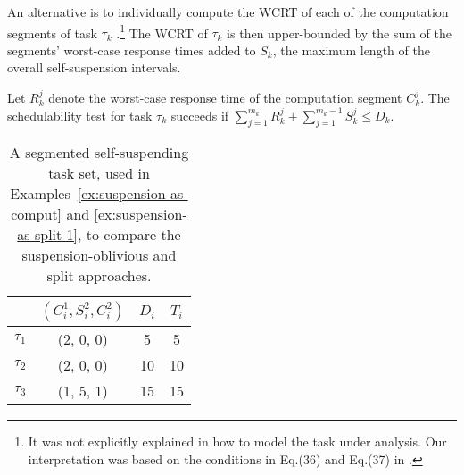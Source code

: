 

\label{sec:model-interferred:split}

An alternative is to individually compute the WCRT of each of the computation segments of task $\tau_k$ \cite{bletsas:thesis,PH:rtss98,Huang:multiseg}.\footnote{\label{footnote-rtss98}It was not explicitly explained in \cite{PH:rtss98} how to model the task under analysis. Our interpretation was based on the conditions in Eq.(36) and Eq.(37) in \cite{PH:rtss98}.}
The WCRT of $\tau_k$ is then upper-bounded by the sum of the segments' worst-case response times added to $S_k$, the maximum length of the overall
self-suspension intervals. 
 
Let $R_k^j$ denote the worst-case response time of the computation segment $C_k^j$. The schedulability test for task $\tau_k$ succeeds if $\sum_{j=1}^{m_k} R_k^j + \sum_{j=1}^{m_k-1} S_k^j \leq D_k $. 

\begin{table}[t]
\centering
    \begin{tabular}{|c|c|c|c|}
 \hline
        & $(C_i^1, S_i^2, C_i^2)$ &  $D_i$ & $T_i$\\ 
        \hline
        $\tau_1$ & (2, 0, 0) &  5 & 5\\ 
        $\tau_2$ &  (2, 0, 0) & 10 & 10 \\ 
        $\tau_3$ & (1, 5, 1) & 15  & 15\\
        \hline
    \end{tabular} 
    \caption{A segmented self-suspending task set, used in Examples~\ref{ex:suspension-as-comput} and \ref{ex:suspension-as-split-1}, to compare the suspension-oblivious and split approaches.}
    \label{table:static-example}
\end{table}


